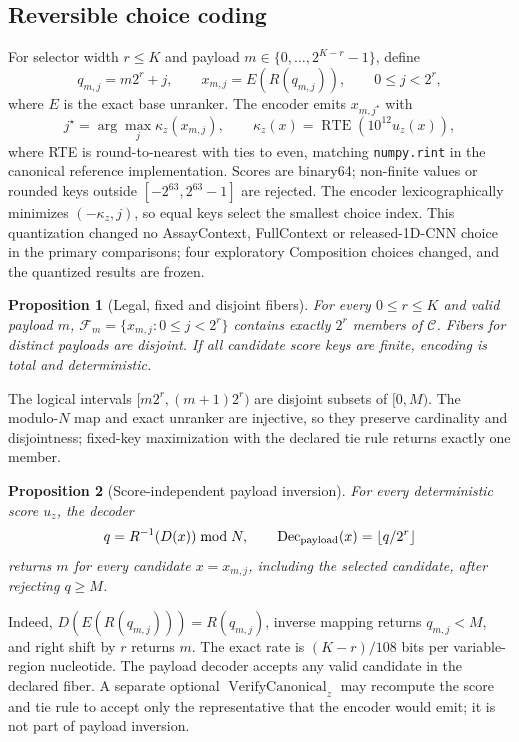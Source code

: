 \documentclass[unnumsec,webpdf,modern,large]{oup-authoring-template}
\newtheorem{proposition}{Proposition}
\begin{document}
\subsection{Reversible choice coding}

For selector width $r\leq K$ and payload $m\in\{0,\ldots,2^{K-r}-1\}$, define
\[
 q_{m,j}=m2^r+j,\qquad
 x_{m,j}=E\!\left(R(q_{m,j})\right),\qquad 0\leq j<2^r,
\]
where $E$ is the exact base unranker. The encoder emits $x_{m,j^\star}$ with
\[
 j^\star=\arg\max_j \kappa_z(x_{m,j}),\qquad
 \kappa_z(x)=\operatorname{RTE}\!\left(10^{12}u_z(x)\right),
\]
where RTE is round-to-nearest with ties to even, matching \texttt{numpy.rint} in the canonical reference implementation. Scores are binary64; non-finite values or rounded keys outside $[-2^{63},2^{63}-1]$ are rejected. The encoder lexicographically minimizes $(-\kappa_z,j)$, so equal keys select the smallest choice index. This quantization changed no AssayContext, FullContext or released-1D-CNN choice in the primary comparisons; four exploratory Composition choices changed, and the quantized results are frozen.

\begin{proposition}[Legal, fixed and disjoint fibers]
For every $0\leq r\leq K$ and valid payload $m$, $\mathcal F_m=\{x_{m,j}:0\leq j<2^r\}$ contains exactly $2^r$ members of $\mathcal C$. Fibers for distinct payloads are disjoint. If all candidate score keys are finite, encoding is total and deterministic.
\end{proposition}

\noindent
The logical intervals $[m2^r,(m+1)2^r)$ are disjoint subsets of $[0,M)$. The modulo-$N$ map and exact unranker are injective, so they preserve cardinality and disjointness; fixed-key maximization with the declared tie rule returns exactly one member.

\begin{proposition}[Score-independent payload inversion]
For every deterministic score $u_z$, the decoder
\[
 q=R^{-1}\!\left(D(x)\right)\bmod N,\qquad
 \operatorname{Dec}_{\rm payload}(x)=\left\lfloor q/2^r\right\rfloor
\]
returns $m$ for every candidate $x=x_{m,j}$, including the selected candidate, after rejecting $q\geq M$.
\end{proposition}

\noindent
Indeed, $D(E(R(q_{m,j})))=R(q_{m,j})$, inverse mapping returns $q_{m,j}<M$, and right shift by $r$ returns $m$. The exact rate is $(K-r)/108$ bits per variable-region nucleotide. The payload decoder accepts any valid candidate in the declared fiber. A separate optional $\operatorname{VerifyCanonical}_z$ may recompute the score and tie rule to accept only the representative that the encoder would emit; it is not part of payload inversion.
\end{document}
